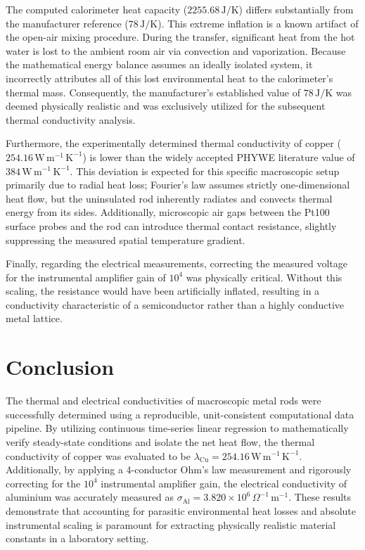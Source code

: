 \documentclass[journal]{IEEEtran}
\begin{document}
The computed calorimeter heat capacity ($2255.68\,\text{J/K}$) differs substantially from the manufacturer 
reference ($78\,\text{J/K}$). This extreme inflation is a known artifact of the open-air mixing procedure. 
During the transfer, significant heat from the hot water is lost to the ambient room air via convection 
and vaporization. Because the mathematical energy balance assumes an ideally isolated system, it incorrectly 
attributes all of this lost environmental heat to the calorimeter's thermal mass. Consequently, the 
manufacturer's established value of $78\,\text{J/K}$ was deemed physically realistic and was exclusively 
utilized for the subsequent thermal conductivity analysis.

Furthermore, the experimentally determined thermal conductivity of copper ($254.16\,\text{W}\,\text{m}^{-1}\,\text{K}^{-1}$) 
is lower than the widely accepted PHYWE literature value of $384\,\text{W}\,\text{m}^{-1}\,\text{K}^{-1}$. This 
deviation is expected for this specific macroscopic setup primarily due to radial heat loss; Fourier's law 
assumes strictly one-dimensional heat flow, but the uninsulated rod inherently radiates and convects thermal 
energy from its sides. Additionally, microscopic air gaps between the Pt100 surface probes and the rod can 
introduce thermal contact resistance, slightly suppressing the measured spatial temperature gradient.

Finally, regarding the electrical measurements, correcting the measured voltage for the instrumental amplifier 
gain of $10^4$ was physically critical. Without this scaling, the resistance would have been artificially 
inflated, resulting in a conductivity characteristic of a semiconductor rather than a highly conductive metal lattice.

\section{Conclusion}
The thermal and electrical conductivities of macroscopic metal rods were successfully determined using a 
reproducible, unit-consistent computational data pipeline. By utilizing continuous time-series linear regression 
to mathematically verify steady-state conditions and isolate the net heat flow, the thermal conductivity of copper 
was evaluated to be $\lambda_{\text{Cu}}=254.16\,\text{W}\,\text{m}^{-1}\,\text{K}^{-1}$. Additionally, by applying 
a 4-conductor Ohm's law measurement and rigorously correcting for the $10^4$ instrumental amplifier gain, the 
electrical conductivity of aluminium was accurately measured as $\sigma_{\text{Al}}=3.820\times10^{6}\,\Omega^{-1}\,\text{m}^{-1}$. 
These results demonstrate that accounting for parasitic environmental heat losses and absolute instrumental scaling 
is paramount for extracting physically realistic material constants in a laboratory setting.
\end{document}
